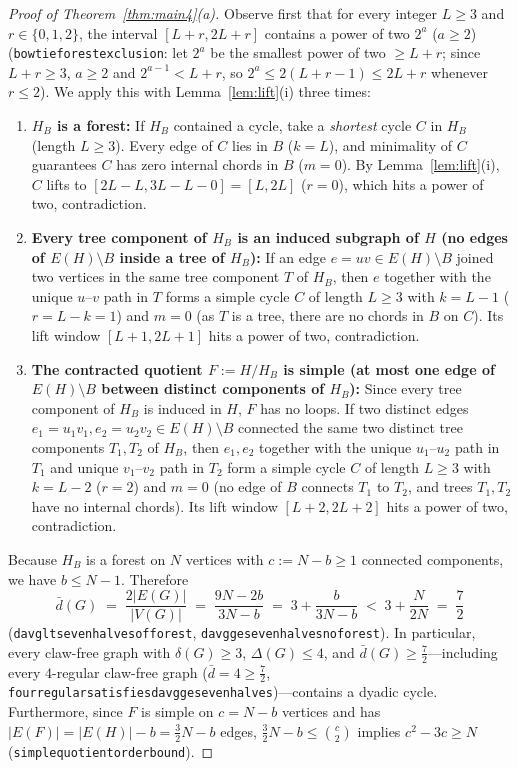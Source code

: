 \documentclass[11pt,reqno]{amsart}
\theoremstyle{plain}
\theoremstyle{definition}
\theoremstyle{remark}
\DeclareRobustCommand{\_}{\ifmmode\text{\textunderscore}\else\textunderscore\allowbreak\fi}
\begin{document}
\begin{proof}[Proof of Theorem~\ref{thm:main4}(a)]
Observe first that for every integer $L \ge 3$ and $r \in \{0, 1, 2\}$, the interval $[L + r, 2L + r]$ contains a power of two $2^a$ ($a \ge 2$) (\texttt{bowtie\_forest\_exclusion}: let $2^a$ be the smallest power of two $\ge L + r$; since $L + r \ge 3$, $a \ge 2$ and $2^{a-1} < L + r$, so $2^a \le 2(L + r - 1) \le 2L + r$ whenever $r \le 2$). We apply this with Lemma~\ref{lem:lift}(i) three times:
\begin{enumerate}[label=(\arabic*),leftmargin=2em]
  \item \textbf{$H_B$ is a forest:} If $H_B$ contained a cycle, take a \emph{shortest} cycle $C$ in $H_B$ (length $L \ge 3$). Every edge of $C$ lies in $B$ ($k = L$), and minimality of $C$ guarantees $C$ has zero internal chords in $B$ ($m = 0$). By Lemma~\ref{lem:lift}(i), $C$ lifts to $[2L - L, 3L - L - 0] = [L, 2L]$ ($r = 0$), which hits a power of two, contradiction.
  \item \textbf{Every tree component of $H_B$ is an induced subgraph of $H$ (no edges of $E(H) \setminus B$ inside a tree of $H_B$):} If an edge $e = uv \in E(H) \setminus B$ joined two vertices in the same tree component $T$ of $H_B$, then $e$ together with the unique $u$--$v$ path in $T$ forms a simple cycle $C$ of length $L \ge 3$ with $k = L - 1$ ($r = L - k = 1$) and $m = 0$ (as $T$ is a tree, there are no chords in $B$ on $C$). Its lift window $[L + 1, 2L + 1]$ hits a power of two, contradiction.
  \item \textbf{The contracted quotient $F := H/H_B$ is simple (at most one edge of $E(H) \setminus B$ between distinct components of $H_B$):} Since every tree component of $H_B$ is induced in $H$, $F$ has no loops. If two distinct edges $e_1 = u_1 v_1, e_2 = u_2 v_2 \in E(H) \setminus B$ connected the same two distinct tree components $T_1, T_2$ of $H_B$, then $e_1, e_2$ together with the unique $u_1$--$u_2$ path in $T_1$ and unique $v_1$--$v_2$ path in $T_2$ form a simple cycle $C$ of length $L \ge 3$ with $k = L - 2$ ($r = 2$) and $m = 0$ (no edge of $B$ connects $T_1$ to $T_2$, and trees $T_1, T_2$ have no internal chords). Its lift window $[L + 2, 2L + 2]$ hits a power of two, contradiction.
\end{enumerate}
Because $H_B$ is a forest on $N$ vertices with $c := N - b \ge 1$ connected components, we have $b \le N - 1$. Therefore
\[
  \bar{d}(G) \;=\; \frac{2|E(G)|}{|V(G)|} \;=\; \frac{9N - 2b}{3N - b} \;=\; 3 + \frac{b}{3N - b} \;<\; 3 + \frac{N}{2N} \;=\; \frac{7}{2}
\]
(\texttt{davg\_lt\_seven\_halves\_of\_forest}, \texttt{davg\_ge\_seven\_halves\_no\_forest}). In particular, every claw-free graph with $\delta(G) \ge 3$, $\Delta(G) \le 4$, and $\bar{d}(G) \ge \frac{7}{2}$---including every $4$-regular claw-free graph ($\bar{d} = 4 \ge \frac{7}{2}$, \texttt{four\_regular\_satisfies\_davg\_ge\_seven\_halves})---contains a dyadic cycle. Furthermore, since $F$ is simple on $c = N - b$ vertices and has $|E(F)| = |E(H)| - b = \frac{3}{2}N - b$ edges, $\frac{3}{2}N - b \le \binom{c}{2}$ implies $c^2 - 3c \ge N$ (\texttt{simple\_quotient\_order\_bound}).


\end{proof}
\end{document}
